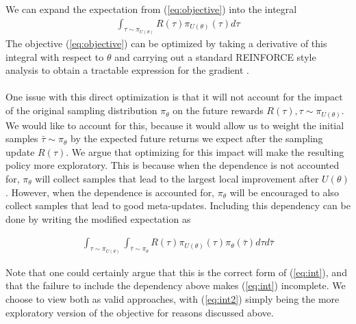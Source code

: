 \documentclass{article} %
\begin{document}
We can expand the expectation from (\ref{eq:objective}) into the integral 
\begin{align}
\int_{\tau \sim \pi_{U(\theta)}} R(\tau) \pi_{U(\theta)} (\tau) d \tau \label{eq:int}
\end{align} 
The objective (\ref{eq:objective}) can be optimized by taking a derivative of this integral with respect to $\theta$ and carrying out a standard REINFORCE style analysis to obtain a tractable expression for the gradient \cite{reinforce}. \\
\\
One issue with this direct optimization is that it will not account for the impact of the original sampling distribution $\pi_\theta$ on the future rewards $R(\tau), \tau \sim \pi_{U(\theta)}$. We would like to account for this, because it would allow us to weight the initial samples $\bar{\tau} \sim \pi_\theta$ by the expected future returns we expect after the sampling update $R(\tau)$. We argue that optimizing for this impact will make the resulting policy more exploratory. This is because when the dependence is not accounted for, $\pi_\theta$ will collect samples that lead to the largest local improvement after $U(\theta)$. However, when the dependence is accounted for, $\pi_\theta$ will be encouraged to also collect samples that lead to good meta-updates. %
Including this dependency can be done by writing the modified expectation as

\begin{align}
\int_{\tau \sim \pi_{U(\theta)}} \int_{\bar{\tau} \sim \pi_\theta} R(\tau) \pi_{U(\theta)} (\tau) \pi_\theta (\bar{\tau}) d \tau d \bar{\tau} \label{eq:int2}
\end{align}

Note that one could certainly argue that this is the correct form of (\ref{eq:int}), and that the failure to include the dependency above makes (\ref{eq:int}) incomplete. We choose to view both as valid approaches, with (\ref{eq:int2}) simply being the more exploratory version of the objective for reasons discussed above. 

\end{document}
